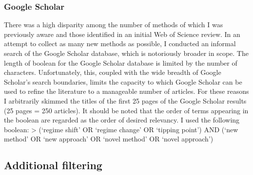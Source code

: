 \documentclass[12pt,twoside,openany]{reedthesis}
\begin{document}
\hypertarget{google-scholar}{%
\subsubsection{Google Scholar}\label{google-scholar}}

There was a high disparity among the number of methods of which I was previously aware and those identified in an initial Web of Science review. In an attempt to collect as many new methods as possible, I conducted an informal search of the Google Scholar database, which is notoriously broader in scope. The length of boolean for the Google Scholar database is limited by the number of characters. Unfortunately, this, coupled with the wide breadth of Google Scholar's search boundaries, limits the capacity to which Google Scholar can be used to refine the literature to a manageable number of articles. For these reasons I arbitrarily skimmed the titles of the first 25 pages of the Google Scholar results (25 pages = 250 articles). It should be noted that the order of terms appearing in the boolean are regarded as the order of desired relevancy. I used the following boolean:
\textgreater{} (`regime shift' OR `regime change' OR `tipping point') AND (`new method' OR `new approach' OR `novel method' OR `novel approach')

\hypertarget{additional-filtering}{%
\subsection{Additional filtering}\label{additional-filtering}}
\end{document}
